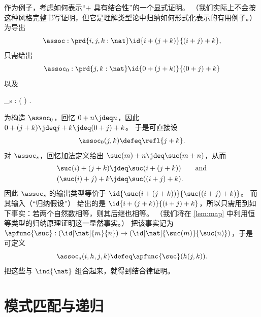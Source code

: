 作为例子，考虑如何表示“$+$ 具有结合性”的一个显式证明。
（我们实际上不会按这种风格完整书写证明，但它是理解类型论中归纳如何形式化表示的有用例子。）
为导出
\[\assoc : \prd{i,j,k:\nat} \id{i + (j + k)}{(i + j) + k}, \]
只需给出
\[ \assoc_0 :  \prd{j,k:\nat} \id{0 + (j + k)}{(0+ j) + k} \]
以及
\begin{narrowmultline*}
  \assoc_s  :  \left( \right)
   \narrowbreak
   \to {} .
\end{narrowmultline*}
为构造 $\assoc_0$，回忆 $0+n \jdeq n$，因此 $0 + (j + k) \jdeq j+k \jdeq (0+ j) + k$。
于是可直接设
\[ \assoc_0(j,k) \defeq \refl{j+k}. \]
对 $\assoc_s$，回忆加法定义给出 $\suc(m)+n \jdeq \suc(m+n)$，从而
\begin{align*}
   \suc(i) + (j + k)  &\jdeq \suc(i+(j+k)) \qquad\text{and}\\
   (\suc(i)+j)+k &\jdeq \suc((i+j)+k).
\end{align*}
因此 $\assoc_s$ 的输出类型等价于 $\id{\suc(i+(j+k))}{\suc((i+j)+k)}$。
而其输入（“归纳假设”）
%
%
给出的是 $\id{i+(j+k)}{(i+j)+k}$，所以只需用到如下事实：若两个自然数相等，则其后继也相等。
（我们将在 \cref{lem:map} 中利用恒等类型的归纳原理证明这一显然事实。）
把该事实记为
$\apfunc{\suc} : %
(\id[\nat]{m}{n}) \to (\id[\nat]{\suc(m)}{\suc(n)})$，于是可定义
\[\assoc_s(i,h,j,k) \defeq \apfunc{\suc}( %
h(j,k)). \]
把这些与 $\ind{\nat}$ 组合起来，就得到结合律证明。

%


\section{模式匹配与递归}
\label{sec:pattern-matching}

